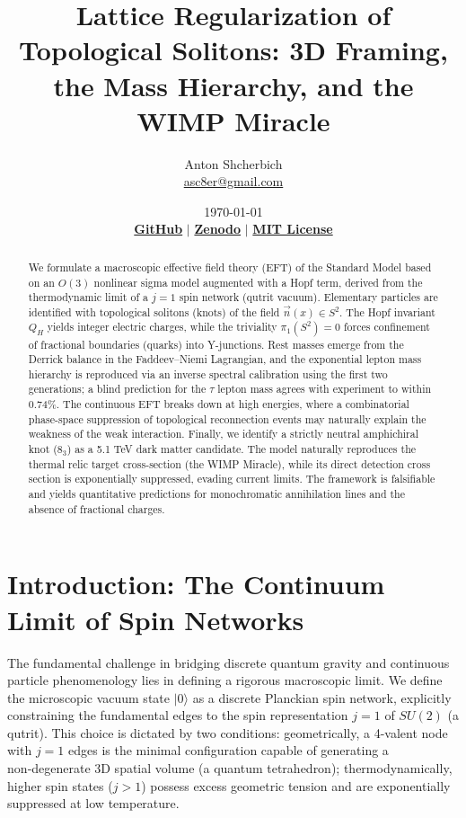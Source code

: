 \documentclass[12pt,a4paper]{article}
\title{Lattice Regularization of Topological Solitons: 3D Framing, the Mass Hierarchy, and the WIMP Miracle}
\author{Anton Shcherbich \\ \small{\href{mailto:asc8er@gmail.com}{asc8er@gmail.com}}}
\date{\today \\ \vspace{0.4cm} \small \href{https://github.com/AntoScher/Lattice-Regularization-Topological-Solitons-EQIT}{\textbf{GitHub}} $\mid$ \href{https://doi.org/10.5281/zenodo.19441820}{\textbf{Zenodo}} $\mid$ \href{https://opensource.org/licenses/MIT}{\textbf{MIT License}}}
\begin{document}
\maketitle

\begin{abstract}
We formulate a macroscopic effective field theory (EFT) of the Standard Model based on an $O(3)$ nonlinear sigma model augmented with a Hopf term, derived from the thermodynamic limit of a $j=1$ spin network (qutrit vacuum). Elementary particles are identified with topological solitons (knots) of the field $\vec{n}(x) \in S^2$. The Hopf invariant $Q_H$ yields integer electric charges, while the triviality $\pi_1(S^2)=0$ forces confinement of fractional boundaries (quarks) into Y-junctions. Rest masses emerge from the Derrick balance in the Faddeev–Niemi Lagrangian, and the exponential lepton mass hierarchy is reproduced via an inverse spectral calibration using the first two generations; a blind prediction for the $\tau$ lepton mass agrees with experiment to within 0.74\%. The continuous EFT breaks down at high energies, where a combinatorial phase-space suppression of topological reconnection events may naturally explain the weakness of the weak interaction. Finally, we identify a strictly neutral amphichiral knot ($8_3$) as a 5.1 TeV dark matter candidate. The model naturally reproduces the thermal relic target cross-section (the WIMP Miracle), while its direct detection cross section is exponentially suppressed, evading current limits. The framework is falsifiable and yields quantitative predictions for monochromatic annihilation lines and the absence of fractional charges.
\end{abstract}

\section{Introduction: The Continuum Limit of Spin Networks}

The fundamental challenge in bridging discrete quantum gravity and continuous particle phenomenology lies in defining a rigorous macroscopic limit. We define the microscopic vacuum state $|0\rangle$ as a discrete Planckian spin network, explicitly constraining the fundamental edges to the spin representation $j=1$ of $SU(2)$ (a qutrit). This choice is dictated by two conditions: geometrically, a 4-valent node with $j=1$ edges is the minimal configuration capable of generating a non‑degenerate 3D spatial volume (a quantum tetrahedron); thermodynamically, higher spin states ($j>1$) possess excess geometric tension and are exponentially suppressed at low temperature.
\end{document}
